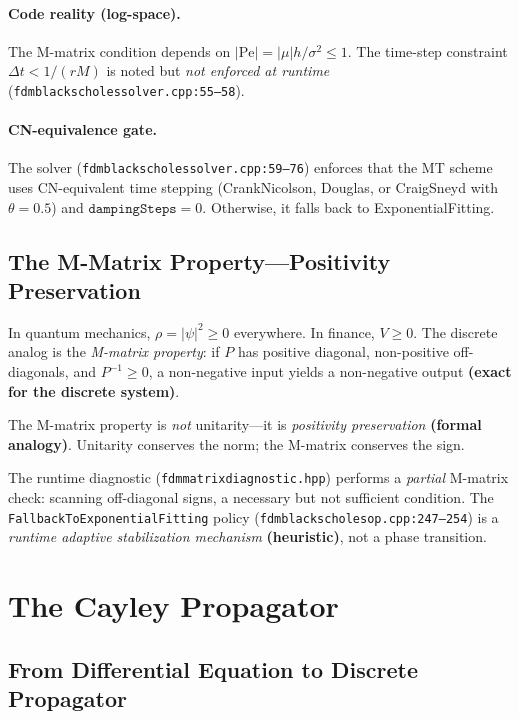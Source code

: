 \paragraph{Code reality (log-space).}
The M-matrix condition depends on $|\mathrm{Pe}| = |\mu|h/\sigma^2 \le 1$.  The time-step constraint $\Delta t < 1/(rM)$ is noted but \emph{not enforced at runtime} (\texttt{fdmblackscholessolver.cpp:55--58}).

\paragraph{CN-equivalence gate.}
The solver (\texttt{fdmblackscholessolver.cpp:59--76}) enforces that the MT scheme uses CN-equivalent time stepping (CrankNicolson, Douglas, or CraigSneyd with $\theta = 0.5$) and $\texttt{dampingSteps} = 0$.  Otherwise, it falls back to ExponentialFitting.

\subsection{The M-Matrix Property---Positivity Preservation}

In quantum mechanics, $\rho = |\psi|^2 \ge 0$ everywhere.  In finance, $V \ge 0$.  The discrete analog is the \emph{M-matrix property}: if $P$ has positive diagonal, non-positive off-diagonals, and $P^{-1} \ge 0$, a non-negative input yields a non-negative output \textbf{(exact for the discrete system)}.

The M-matrix property is \emph{not} unitarity---it is \emph{positivity preservation} \textbf{(formal analogy)}.  Unitarity conserves the norm; the M-matrix conserves the sign.

The runtime diagnostic (\texttt{fdmmatrixdiagnostic.hpp}) performs a \emph{partial} M-matrix check: scanning off-diagonal signs, a necessary but not sufficient condition.  The \texttt{FallbackToExponentialFitting} policy (\texttt{fdmblackscholesop.cpp:247--254}) is a \emph{runtime adaptive stabilization mechanism} \textbf{(heuristic)}, not a phase transition.

\section{The Cayley Propagator}
\label{sec:cayley-propagator}

\subsection{From Differential Equation to Discrete Propagator}

